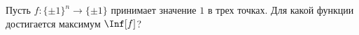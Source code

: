 Пусть $f\colon \{\pm 1\}^n \to \{\pm 1\}$ принимает значение $1$ в трех точках. Для какой функции
достигается максимум $\Inf[f]$? 